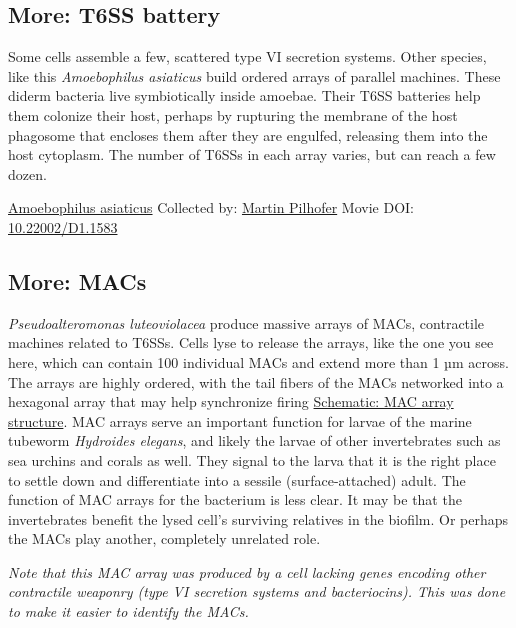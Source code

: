 \documentclass[]{tufte-book}
\begin{document}
\hypertarget{T6SS_battery}{%
\subsection*{More: T6SS battery}\label{T6SS_battery}}

Some cells assemble a few, scattered type VI secretion systems. Other species, like this \emph{Amoebophilus asiaticus} build ordered arrays of parallel machines. These diderm bacteria live symbiotically inside amoebae. Their T6SS batteries help them colonize their host, perhaps by rupturing the membrane of the host phagosome that encloses them after they are engulfed, releasing them into the host cytoplasm. The number of T6SSs in each array varies, but can reach a few dozen.



\hypertarget{htmlwidget-1f7b86d7ad2216d9f0ea}{}

\label{fig:9-7a}\protect\hyperlink{tree}{Amoebophilus asiaticus} Collected by: \protect\hyperlink{martin_pilhofer}{Martin Pilhofer} Movie DOI: \href{https://doi.org/10.22002/D1.1583}{10.22002/D1.1583}

\hypertarget{MACs}{%
\subsection*{More: MACs}\label{MACs}}

\emph{Pseudoalteromonas luteoviolacea} produce massive arrays of MACs, contractile machines related to T6SSs. Cells lyse to release the arrays, like the one you see here, which can contain 100 individual MACs and extend more than 1 µm across. The arrays are highly ordered, with the tail fibers of the MACs networked into a hexagonal array that may help synchronize firing \protect\hyperlink{MAC_array_structure}{Schematic: MAC array structure}. MAC arrays serve an important function for larvae of the marine tubeworm \emph{Hydroides elegans}, and likely the larvae of other invertebrates such as sea urchins and corals as well. They signal to the larva that it is the right place to settle down and differentiate into a sessile (surface-attached) adult. The function of MAC arrays for the bacterium is less clear. It may be that the invertebrates benefit the lysed cell's surviving relatives in the biofilm. Or perhaps the MACs play another, completely unrelated role.

\emph{Note that this MAC array was produced by a cell lacking genes encoding other contractile weaponry (type VI secretion systems and bacteriocins). This was done to make it easier to identify the MACs.}
\end{document}
